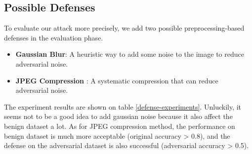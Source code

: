 \documentclass{article}
\begin{document}
\subsection{Possible Defenses}
To evaluate our attack more precisely, we add two possible preprocessing-based defenses in the evaluation phase.

\begin{itemize}
  \item \textbf{Gaussian Blur}: A heuristic way to add some noise to the image to reduce adversarial noise.
  \item \textbf{JPEG Compression} \cite{das2017keeping}: A systematic compression that can reduce adversarial noise.
\end{itemize}

The experiment results are shown on table \ref{defense-experiments}. Unluckily, it seems not to be a good idea to add gaussian noise because it also affect the benign dataset a lot. As for JPEG compression method, the performance on benign dataset is much more acceptable (original accuracy > 0.8), and the defense on the adversarial dataset is also successful (adversarial accuracy > 0.5).
\end{document}
